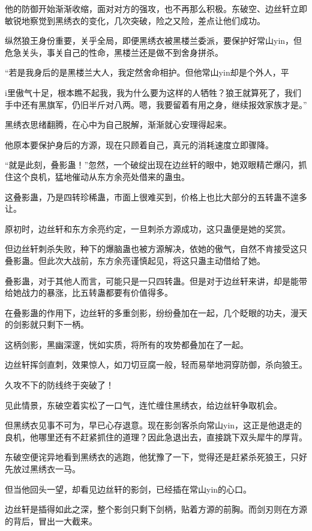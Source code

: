 \begin{this_body}
他的防御开始渐渐收缩，面对对方的强攻，也不再那么积极。东破空、边丝轩立即敏锐地察觉到黑绣衣的变化，几次突破，险之又险，差点让他们成功。

纵然狼王身份重要，关乎全局，即便黑绣衣被黑楼兰委派，要保护好常山yin，但危急关头，事关自己的性命，黑楼兰还是做不到舍身拼杀。

“若是我身后的是黑楼兰大人，我定然舍命相护。但他常山yin却是个外人，平

i里傲气十足，根本瞧不起我，我为什么要为这样的人牺牲？狼王就算死了，我们手中还有黑旗军，仍旧半斤对八两。嗯，我要留着有用之身，继续报效家族才是。”

黑绣衣思绪翻腾，在心中为自己脱解，渐渐就心安理得起来。

他原本要保护身后的方源，现在只顾着自己，真元的消耗速度立即骤降。

“就是此刻，叠影蛊！”忽然，一个破绽出现在边丝轩的眼中，她双眼精芒爆闪，抓住这个良机，猛地催动从东方余亮处借来的蛊虫。

这叠影蛊，乃是四转珍稀蛊，市面上很难买到，价格上也比大部分的五转蛊不遑多让。

原初时，边丝轩和东方余亮约定，一旦刺杀方源成功，这只蛊便是她的奖赏。

但边丝轩刺杀失败，种下的爆脑蛊也被方源解决，依她的傲气，自然不肯接受这只叠影蛊。但此次大战前，东方余亮谨慎起见，将这只蛊主动借给了她。

叠影蛊，对于其他人而言，可能只是一只四转蛊。但是对于边丝轩来讲，却是能带给她战力的暴涨，比五转蛊都要有价值得多。

在叠影蛊的作用下，边丝轩的多重剑影，纷纷叠加在一起，几个眨眼的功夫，漫天的剑影就只剩下一柄。

这柄剑影，黑幽深邃，恍如实质，将所有的攻势都叠加在了一起。

边丝轩挥剑直刺，效果惊人，如刀切豆腐一般，轻而易举地洞穿防御，杀向狼王。

久攻不下的防线终于突破了！

见此情景，东破空着实松了一口气，连忙缠住黑绣衣，给边丝轩争取机会。

但黑绣衣见事不可为，早已心存退意。现在影剑客杀向常山yin，这正是他退走的良机，他哪里还有不赶紧抓住的道理？因此急退出去，直接跳下双头犀牛的厚背。

东破空便诧异地看到黑绣衣的逃跑，他犹豫了一下，觉得还是赶紧杀死狼王，只好先放过黑绣衣一马。

但当他回头一望，却看见边丝轩的影剑，已经插在常山yin的心口。

边丝轩是插得如此之深，整个影剑只剩下剑柄，贴着方源的前胸。而剑刃则在方源的背后，冒出一大截来。


\end{this_body}
